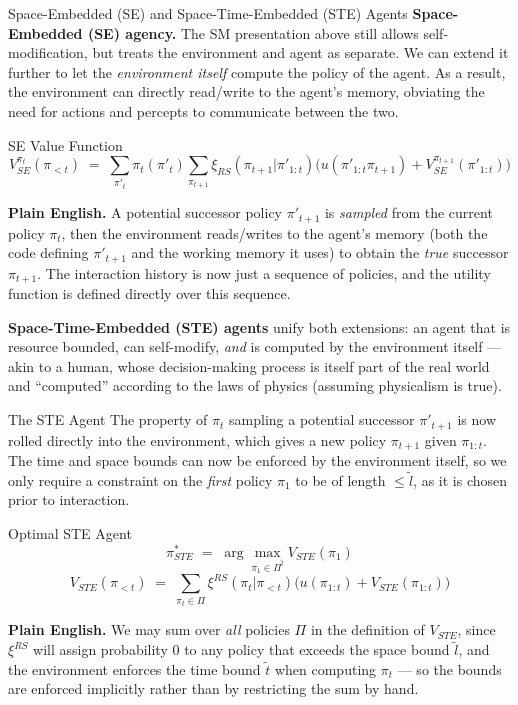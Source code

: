\documentclass[aspectratio=169,10pt]{beamer}
\begin{document}
\begin{frame}{Space-Embedded (SE) and Space-Time-Embedded (STE) Agents}
  \textbf{Space-Embedded (SE) agency.} The SM presentation above still
  allows self-modification, but treats the environment and agent as
  separate. We can extend it further to let the \emph{environment itself}
  compute the policy of the agent. As a result, the environment can
  directly read/write to the agent's memory, obviating the need for
  actions and percepts to communicate between the two.

  \begin{block}{SE Value Function}
    \[
      V_{SE}^{\pi_t}(\pi_{<t}) \;=\; \sum_{\pi'_t}\pi_t(\pi'_t)
      \sum_{\pi_{t+1}}\xi_{RS}(\pi_{t+1}|\pi'_{1:t})\big(u(\pi'_{1:t}\pi_{t+1})
      + V_{SE}^{\pi_{t+1}}(\pi'_{1:t})\big)
    \]
  \end{block}
  \textbf{Plain English.} A potential successor policy $\pi'_{t+1}$ is
  \emph{sampled} from the current policy $\pi_t$, then the environment
  reads/writes to the agent's memory (both the code defining $\pi'_{t+1}$
  and the working memory it uses) to obtain the \emph{true} successor
  $\pi_{t+1}$. The interaction history is now just a sequence of
  policies, and the utility function is defined directly over this
  sequence.

  \vspace{0.4em}
  \textbf{Space-Time-Embedded (STE) agents} unify both extensions: an
  agent that is resource bounded, can self-modify, \emph{and} is computed
  by the environment itself --- akin to a human, whose decision-making
  process is itself part of the real world and ``computed'' according to
  the laws of physics (assuming physicalism is true).
\end{frame}

\begin{frame}{The STE Agent}
  The property of $\pi_t$ sampling a potential successor $\pi'_{t+1}$ is
  now rolled directly into the environment, which gives a new policy
  $\pi_{t+1}$ given $\pi_{1:t}$. The time and space bounds can now be
  enforced by the environment itself, so we only require a constraint on
  the \emph{first} policy $\pi_1$ to be of length $\le\tilde l$, as it is
  chosen prior to interaction.

  \begin{block}{Optimal STE Agent}
    \[
      \pi^*_{STE} \;=\; \arg\max_{\pi_1\in\Pi^{\tilde l}} V_{STE}(\pi_1)
    \]
    \[
      V_{STE}(\pi_{<t}) \;=\; \sum_{\pi_t\in\Pi}\xi^{RS}(\pi_t|\pi_{<t})
      \big(u(\pi_{1:t}) + V_{STE}(\pi_{1:t})\big)
    \]
  \end{block}
  \textbf{Plain English.} We may sum over \emph{all} policies $\Pi$ in the
  definition of $V_{STE}$, since $\xi^{RS}$ will assign probability $0$
  to any policy that exceeds the space bound $\tilde l$, and the
  environment enforces the time bound $\tilde t$ when computing $\pi_t$
  --- so the bounds are enforced implicitly rather than by restricting the
  sum by hand.
\end{frame}
\end{document}
